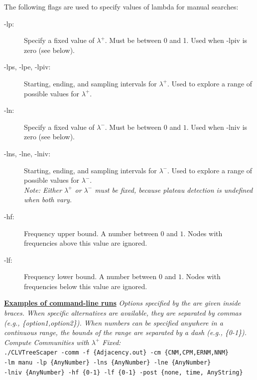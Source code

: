 \documentclass[11pt]{article}
\begin{document}
\begin{enumerate}[{\bf (1)}]
\begin{description}
\vspace{0.5cm}
	\end{description}

	The following flags are used to specify values of lambda for manual searches:
	\begin{description}
	\item[-lp:] Specify a fixed value of $\lambda^{+}$. Must be between 0 and 1. Used when -lpiv is zero (see below).
	
	\item[-lps, -lpe, -lpiv:] Starting, ending, and sampling intervals for $\lambda^{+}$. Used to explore a range of possible values for $\lambda^{+}$.
	
	\item[-ln:] Specify a fixed value of $\lambda^{-}$. Must be between $0$ and $1$. Used when -lniv is zero (see below).
	
	\item[-lns, -lne, -lniv:] Starting, ending, and sampling intervals for $\lambda^{-}$. Used to explore a range of possible values for $\lambda^{-}$. \\

{\it Note: Either $\lambda^{+}$ or $\lambda^{-}$ must be fixed, because plateau detection is undefined when both vary.} \\

	\item[-hf:] Frequency upper bound. A number between $0$ and $1$. Nodes with frequencies
above this value are ignored.

	\item[-lf:] Frequency lower bound. A number between $0$ and $1$. Nodes with frequencies
below this value are ignored.
	\end{description}

\vspace{0.5cm}

\ul{\bf Examples of command-line runs}
{\it Options specified by the are given inside braces. When specific alternatives are available, they
are separated by commas (e.g., \{option1,option2\}). When numbers can be specified anywhere in
a continuous range, the bounds of the range are separated by a dash (e.g., \{0-1\}).} \\

{\it Compute Communities with $\lambda^{+}$ Fixed:} \\
{\tt ./CLVTreeScaper -comm -f \{Adjacency.out\} -cm \{CNM,CPM,ERNM,NNM\}} \\
{\tt -lm manu -lp \{AnyNumber\} -lns \{AnyNumber\} -lne \{AnyNumber\}} \\
{\tt -lniv \{AnyNumber\} -hf \{0-1\} -lf \{0-1\} -post \{none, time, AnyString\}}\\


\end{enumerate}
\end{document}
